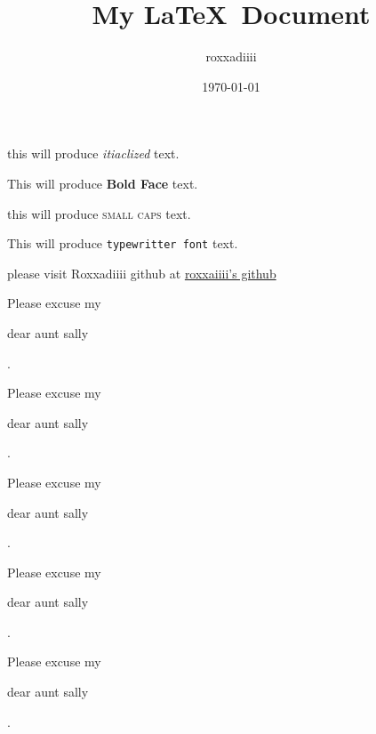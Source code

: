 \documentclass[15pt]{article}                  %
\title{My \LaTeX\  Document}                   %
\author{roxxadiiii}                            %
\date{\today}                                  %
\begin{document}
	
	\tableofcontents                            %
	
	\maketitle                                  %
	
	this will produce \textit{itiaclized} text.             %
	
	This will produce \textbf{Bold Face} text.              %
	
	this will produce \textsc{small caps} text.             %
	
	This will produce \texttt{typewritter font} text.       %
	
	\vspace{2cm}                                %
	
	please visit Roxxadiiii github at \href{https://github.com/roxxadiiii/latex}{roxxaiiii's github}
	
	\vspace{2cm}
	
	Please excuse my \begin{large}
		dear aunt sally
	\end{large}.
	
	Please excuse my \begin{Large}
		dear aunt sally
	\end{Large}.
	
	Please excuse my \begin{huge}
		dear aunt sally
	\end{huge}.
	
	Please excuse my \begin{Huge}
		dear aunt sally
	\end{Huge}.
	
	Please excuse my \begin{normalsize}
		dear aunt sally
	\end{normalsize}.
	
\end{document}
